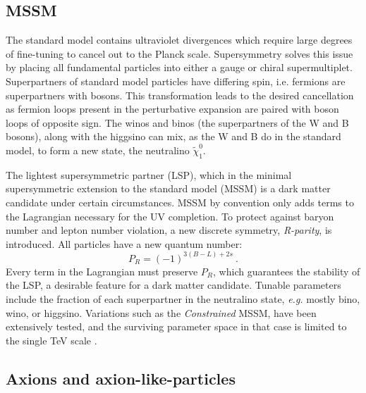 \subsection{MSSM}
 The standard model contains ultraviolet divergences which require large degrees of fine-tuning to cancel out to the Planck scale\cite{shan_minimal_2003}.
 Supersymmetry solves this issue by placing all fundamental particles into either a gauge or chiral supermultiplet.
 Superpartners of standard model particles have differing spin, i.e. fermions are superpartners with bosons.
 This transformation leads to the desired cancellation as fermion loops present in the perturbative expansion are paired with boson loops of opposite sign.
 The winos and binos (the superpartners of the W and B bosons), along with the higgsino can mix, as the W and B do in the standard model, to form a new state, the neutralino $\tilde \chi_1^0$.
 
 The lightest supersymmetric partner (LSP), which in the minimal supersymmetric extension to the standard model (MSSM) is a dark matter candidate under certain circumstances. 
 MSSM by convention only adds terms to the Lagrangian necessary for the UV completion.
 To protect against baryon number and lepton number violation, a new discrete symmetry, \textit{R-parity}, is introduced\cite{jungman_supersymmetric_1996}.
 All particles have a new quantum number: 
 \begin{equation}
     P_R = (-1)^{3(B-L)+2s}~.
 \end{equation}
 \noindent
 Every term in the Lagrangian must preserve $P_R$, which guarantees the stability of the LSP, a desirable feature for a dark matter candidate. 
Tunable parameters include the fraction of each superpartner in the neutralino state, \textit{e.g.} mostly bino, wino, or higgsino.
Variations such as the \textit{Constrained} MSSM\cite{kane_study_1994}, have been extensively tested, and the surviving parameter space in that case is limited to the single TeV scale \cite{ellis_cmssm_2022}.


\subsection{Axions and axion-like-particles}

